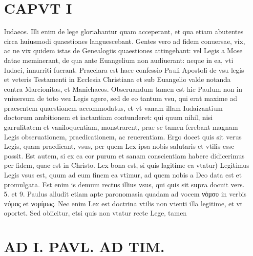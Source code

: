 \documentclass{article}
\begin{document}
\begin{pages}
\section*{CAPVT  I }
\marginpar{[ p.19 ]}\pstart Iudaeos. Illi enim de lege gloriabantur quam acceperant, et qua etiam abutentes circa huiusmodi quaestiones languescebant. Gentes vero ad fidem conuersae, vix, ac ne vix quidem istas de Genealogiis quaestiones attingebant: vel Legis a Mose datae meminerant, de qua ante Euangelium non audiuerant: neque in ea, vti Iudaei, innurriti fuerant. Praeclara est haec confessio Pauli Apostoli de vsu legis et veteris Testamenti in Ecclesia Christiana et sub Euangelio valde notanda contra Marcionitas, et Manichaeos. Obseruandum tamen est hic Paulum non in vniuersum de toto vsu Legis agere, sed de eo tantum vsu, qui erat maxime ad praesentem quaestionem accommodatus, et vt vanam illam Iudaizantium doctorum ambitionem et iactantiam contunderet: qui quum nihil, nisi garrulitatem et vaniloquentiam, monstrarent, prae se tamen ferebant magnam Legis obseruationem, praedicationem, ac reuerentiam. Ergo docet quis sit verus Legis, quam praedicant, vsus, per quem Lex ipsa nobis salutaris et vtilis esse possit. Est autem, si ex ea cor purum et sanam conscientiam habere didicerimus per fidem, quae est in Christo. Lex bona est, si quis lagitime ea vtatur) Legitimus Legis vsus est, quum ad eum finem ea vtimur, ad quem nobis a Deo data est et promulgata. Est enim is demum rectus illius vsus, qui quis sit supra docuit vers. 5. et 9. Paulus alludit etiam apte paronomasia quadam ad vocem νόμου in verbis vόμος et νομίμως. Nec enim Lex est doctrina vtilis non vtenti illa legitime, et vt oportet. Sed obiicitur, etsi quis non vtatur recte Lege, tamen  \pend
\section*{AD I. PAVL. AD TIM. }
\marginpar{[ p.20 ]}\pstart {}
{}

\end{pages}
\end{document}
